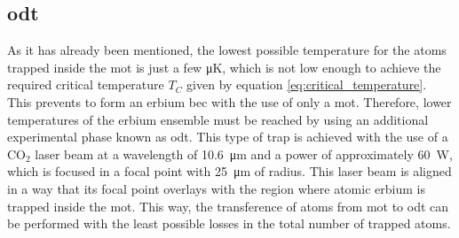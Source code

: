 

\subsection{\Acl{odt}}\label{subsec:Optical_dipole_trap}

As it has already been mentioned, the lowest possible temperature for the atoms trapped inside the \ac{mot} is just a few \si{\micro\kelvin}, which is not low enough to achieve the required critical temperature $T_C$ given by equation \eqref{eq:critical_temperature}. This prevents to form an erbium \acl{bec} with the use of only a \acl{mot}. Therefore, lower temperatures of the erbium ensemble must be reached by using an additional experimental phase known as \Acf{odt}. This type of trap is achieved with the use of a $\text{CO}_2$ laser beam at a wavelength of \SI{10.6}{\micro\meter} and a power of approximately \SI{60}{\watt}, which is focused in a focal point with \SI{25}{\micro\meter} of radius. This laser beam is aligned in a way that its focal point overlays with the region where atomic erbium is trapped inside the \ac{mot}. This way, the transference of atoms from \ac{mot} to \ac{odt} can be performed with the least possible losses in the total number of trapped atoms. 

